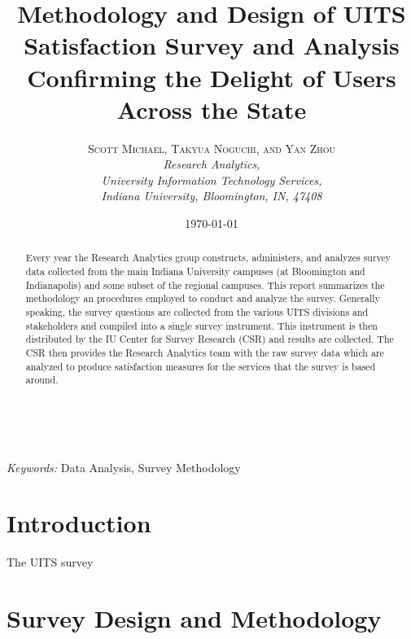 \documentclass[12pt]{article} %
\title{\textbf{Methodology and Design of UITS Satisfaction Survey and Analysis}\\ %
Confirming the Delight of Users Across the State} %
\author{\textsc{Scott Michael, Takyua Noguchi, and Yan Zhou} %
\\{\textit{Research Analytics,\\
                University Information Technology Services,\\ 
                Indiana University, Bloomington, IN, 47408}}} %
\date{\today} %
\makeatletter
\renewcommand{\maketitle}{ %
\begin{flushright} %
{\LARGE\@title} %

\vspace{50pt} %

{\large\@author} %
\\\@date %

\vspace{40pt} %
\end{flushright}
}
\makeatother
\begin{document}
\maketitle %



\begin{abstract}
Every year the Research Analytics group constructs, administers, and analyzes survey data collected from the
main Indiana University campuses (at Bloomington and Indianapolis) and some subset of the regional
campuses. This report summarizes the methodology an procedures employed to conduct and analyze the
survey. Generally speaking, the survey questions are collected from the various UITS divisions and
stakeholders and compiled into a single survey instrument. This instrument is then distributed by the IU
Center for Survey Research (CSR) and results are collected. The CSR then provides the Research Analytics team
with the raw survey data which are analyzed to produce satisfaction measures for the services that the survey
is based around.
\end{abstract}

\hspace*{3,6mm}\textit{Keywords:} Data Analysis, Survey Methodology %

\vspace{30pt} %


\section*{Introduction}
The UITS survey 



\section*{Survey Design and Methodology}
\end{document}
